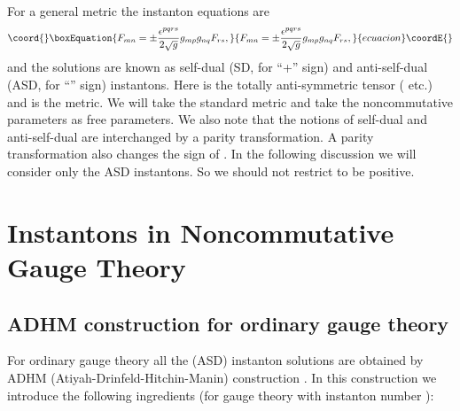 \documentclass[a4paper,a4paper]{article}
\begin{document}
For a general metric \coordHE{} the instanton equations are
\begin{equation}\coord{}\boxEquation{  \label{instanton}
F_{mn}=\pm\frac{\epsilon^{pqrs}}{2\sqrt{g}}g_{mp}g_{nq}F_{rs},
}{  F_{mn}=\pm\frac{\epsilon^{pqrs}}{2\sqrt{g}}g_{mp}g_{nq}F_{rs},
}{ecuacion}\coordE{}\end{equation}
and the solutions are known as self-dual (SD, for ``+'' sign) and
anti-self-dual (ASD, for ``\myHighlight{$-$}\coordHE{}'' sign) instantons. Here \coordHE{} is
the totally anti-symmetric tensor (\coordHE{} etc.) and \coordHE{} is the
metric. We will take the standard metric \coordHE{} and take the
noncommutative parameters \coordHE{} as free parameters. We also note
that the notions of self-dual and anti-self-dual are interchanged by a
parity transformation. A parity transformation also changes the sign of \coordHE{}. In the following discussion we will consider only the ASD
instantons. So we should not restrict \coordHE{} to be positive.

\section{Instantons in Noncommutative Gauge Theory}

\subsection{ADHM construction for ordinary gauge theory}

For ordinary gauge theory all the (ASD) instanton solutions are obtained by
ADHM (Atiyah-Drinfeld-Hitchin-Manin) construction \cite{ADHM}. In this
construction we introduce the following ingredients (for \coordHE{} gauge theory
with instanton number \coordHE{}):
\end{document}
